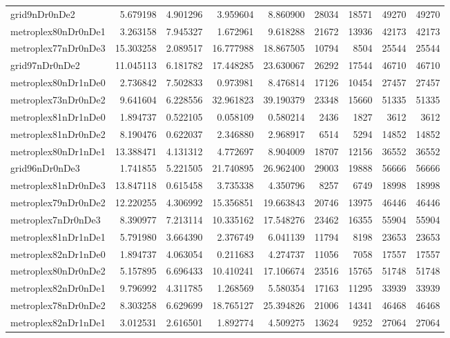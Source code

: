 \begin{longtable}{|l|r|r|r|r|r|r|r|r|}
grid9nDr0nDe2 & 5.679198 & 4.901296 & 3.959604 & 8.860900 & 28034 & 18571 & 49270 & 49270 \\
metroplex80nDr0nDe1 & 3.263158 & 7.945327 & 1.672961 & 9.618288 & 21672 & 13936 & 42173 & 42173 \\
metroplex77nDr0nDe3 & 15.303258 & 2.089517 & 16.777988 & 18.867505 & 10794 & 8504 & 25544 & 25544 \\
grid97nDr0nDe2 & 11.045113 & 6.181782 & 17.448285 & 23.630067 & 26292 & 17544 & 46710 & 46710 \\
metroplex80nDr1nDe0 & 2.736842 & 7.502833 & 0.973981 & 8.476814 & 17126 & 10454 & 27457 & 27457 \\
metroplex73nDr0nDe2 & 9.641604 & 6.228556 & 32.961823 & 39.190379 & 23348 & 15660 & 51335 & 51335 \\
metroplex81nDr1nDe0 & 1.894737 & 0.522105 & 0.058109 & 0.580214 & 2436 & 1827 & 3612 & 3612 \\
metroplex81nDr0nDe2 & 8.190476 & 0.622037 & 2.346880 & 2.968917 & 6514 & 5294 & 14852 & 14852 \\
metroplex80nDr1nDe1 & 13.388471 & 4.131312 & 4.772697 & 8.904009 & 18707 & 12156 & 36552 & 36552 \\
grid96nDr0nDe3 & 1.741855 & 5.221505 & 21.740895 & 26.962400 & 29003 & 19888 & 56666 & 56666 \\
metroplex81nDr0nDe3 & 13.847118 & 0.615458 & 3.735338 & 4.350796 & 8257 & 6749 & 18998 & 18998 \\
metroplex79nDr0nDe2 & 12.220255 & 4.306992 & 15.356851 & 19.663843 & 20746 & 13975 & 46446 & 46446 \\
metroplex7nDr0nDe3 & 8.390977 & 7.213114 & 10.335162 & 17.548276 & 23462 & 16355 & 55904 & 55904 \\
metroplex81nDr1nDe1 & 5.791980 & 3.664390 & 2.376749 & 6.041139 & 11794 & 8198 & 23653 & 23653 \\
metroplex82nDr1nDe0 & 1.894737 & 4.063054 & 0.211683 & 4.274737 & 11056 & 7058 & 17557 & 17557 \\
metroplex80nDr0nDe2 & 5.157895 & 6.696433 & 10.410241 & 17.106674 & 23516 & 15765 & 51748 & 51748 \\
metroplex82nDr0nDe1 & 9.796992 & 4.311785 & 1.268569 & 5.580354 & 17163 & 11295 & 33939 & 33939 \\
metroplex78nDr0nDe2 & 8.303258 & 6.629699 & 18.765127 & 25.394826 & 21006 & 14341 & 46468 & 46468 \\
metroplex82nDr1nDe1 & 3.012531 & 2.616501 & 1.892774 & 4.509275 & 13624 & 9252 & 27064 & 27064 \\

\end{longtable}
